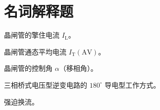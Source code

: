 \documentclass[电力电子]{subfiles}
\begin{document}
	\section{名词解释题}
	\begin{ti}[4 分]
		晶闸管的擎住电流 $I_{\mathrm{L}}$。
	\end{ti}

	\begin{ti}[4 分]
		晶闸管通态平均电流 $I_{\mathrm{T}}(\mathrm{AV})$。
	\end{ti}

	\begin{ti}[4 分]
		晶闸管的控制角 $\alpha$（移相角）。
	\end{ti}

	\begin{ti}[4 分]
		三相桥式电压型逆变电路的 $180^\circ$ 导电型工作方式。
	\end{ti}

	\begin{ti}[4 分]
		强迫换流。
	\end{ti}
\end{document}
